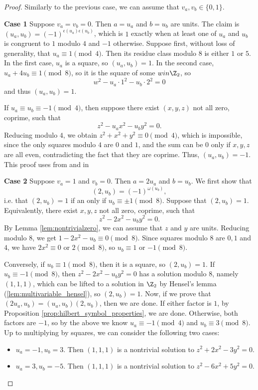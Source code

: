 \begin{proof}
	Similarly to the previous case, we can assume that $v_a, v_b \in \{0, 1\}$.

	\noindent\textbf{Case 1} Suppose $v_a=v_b=0$. Then $a=u_a$ and $b=u_b$ are units. The claim is
		$(u_a,u_b)=(-1)^{\epsilon(u_a)\epsilon(u_b)}$, which is $1$ exactly when at least one of $u_a$
		and $u_b$ is congruent to $1$ modulo $4$ and $-1$ otherwise.
		Suppose first, without loss of generality, that $u_a \equiv 1 \pmod 4$. Then its residue class
		modulo $8$ is either $1$ or $5$. In the first case, $u_a$ is a square, so $(u_a,u_b)=1$. In the
		second case, $u_a+4u_b \equiv 1 \pmod 8$, so it is the square of some $w in \Z_2$, so
		\[
		w^2-u_a\cdot 1^2- u_b\cdot 2^2 = 0
		\]
		and thus $(u_a,u_b)=1$.

		If $u_a \equiv u_b \equiv -1 \pmod 4$, then suppose there exist $(x,y,z)$ not all zero, coprime,
		such that
		\[
		z^2-u_ax^2-u_by^2=0.
		\]
		Reducing modulo $4$, we obtain $z^2+x^2+y^2 \equiv 0 \pmod 4$, which is impossible, since the
		only squares modulo $4$ are $0$ and $1$, and the sum can be $0$ only if $x,y,z$ are all even,
		contradicting the fact that they are coprime. Thus, $(u_a,u_b)=-1$.
		This proof uses  from  and  in 

		\noindent\textbf{Case 2} Suppose $v_a=1$ and $v_b=0$. Then $a=2 u_a$ and $b=u_b$. We first show that
		\[
		(2, u_b) = (-1)^{\omega(u_b)},
		\]
		i.e. that $(2, u_b)=1$ if an only if $u_b \equiv \pm 1 \pmod 8$.
		Suppose that $(2, u_b)=1$. Equivalently, there exist $x,y,z$ not all zero, coprime, such that
		\[
		z^2-2x^2-u_by^2=0.
		\]
		By Lemma \ref{lem:nontrivialzero}, we can assume that $z$ and $y$ are units.
		Reducing modulo $8$, we get $1 - 2x^2 - u_b \equiv 0 \pmod 8$. Since squares modulo $8$ are
		$0, 1$ and $4$, we have $2x^2 \equiv 0$ or $2 \pmod 8$, so $u_b \equiv 1$ or $-1 \pmod 8$.

		Conversely, if $u_b \equiv 1 \pmod 8$, then it is a square, so $(2, u_b)=1$.
		If $u_b \equiv -1 \pmod 8$, then $z^2-2x^2-u_by^2=0$ has a solution modulo $8$, namely $(1,1,1)$,
		which can be lifted to a solution in $\Z_2$ by Hensel's lemma (\ref{lem:multivariable_hensel}),
		so $(2, u_b)=1$. Now, if we prove that $(2u_a,u_b)=(u_a,u_b)(2,u_b)$, then we are done. If either
		factor is $1$, by Proposition \ref{prop:hilbert_symbol_properties}, we are done. Otherwise, both
		factors are $-1$, so by the above we know $u_a \equiv -1 \pmod 4$ and $u_b \equiv 3 \pmod 8$. Up
		to multiplying by squares, we can consider the following two cases:
		\begin{itemize}
			\item $u_a=-1,u_b=3$. Then $(1,1,1)$ is a nontrivial solution to $z^2+2x^2-3y^2=0$.
			\item $u_a=3,u_b=-5$. Then $(1,1,1)$ is a nontrivial solution to $z^2-6x^2+5y^2=0$.
		\end{itemize}


\end{proof}
